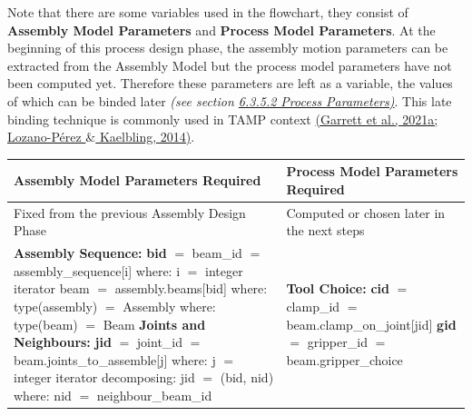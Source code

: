 \documentclass[11pt]{book}
\begin{document}
Note that there are some variables used in the flowchart, they consist of \textbf{Assembly Model Parameters} and \textbf{Process Model Parameters}. At the beginning of this process design phase, the assembly motion parameters can be extracted from the Assembly Model but the process model parameters have not been computed yet. Therefore these parameters are left as a variable, the values of which can be binded later \textit{\textcolor[HTML]{B7B7B7}{(see section \uline{6.3.5.2 Process Parameters)}}}. This late binding technique is commonly used in TAMP context \href{https://www.zotero.org/google-docs/?svi3ss}{(Garrett et al., 2021a; Lozano-Pérez $\&$ Kaelbling, 2014)}.

\begin{table}[H]
\begin{adjustbox}{max width=\textwidth}
\begin{tabular}{p{7.91cm}p{7.97cm}}
\hline
\multicolumn{1}{|p{7.91cm}}{{\footnotesize \textbf{Assembly Model Parameters Required}}} & 
\multicolumn{1}{|p{7.97cm}|}{{\footnotesize \textbf{Process Model Parameters Required}}} \\ 
\hline
\multicolumn{1}{|p{7.91cm}}{{\footnotesize Fixed from the previous Assembly Design Phase}} & 
\multicolumn{1}{|p{7.97cm}|}{{\footnotesize Computed or chosen later in the next steps}} \\ 
\hline
\multicolumn{1}{|p{7.91cm}}{{\footnotesize \textbf{Assembly Sequence:}} \newline
{\footnotesize \textbf{bid }$=$ beam\_id $=$ assembly\_sequence[i]} \newline
{\footnotesize     where: i $=$ integer iterator} \newline
{\footnotesize beam $=$ assembly.beams[bid]} \newline
{\footnotesize     where: type(assembly) $=$ Assembly} \newline
{\footnotesize     where: type(beam) $=$ Beam} \newline
{\footnotesize \textbf{Joints and Neighbours:}} \newline
{\footnotesize \textbf{jid }$=$ joint\_id $=$ beam.joints\_to\_assemble[j] } \newline
{\footnotesize     where: j $=$ integer iterator} \newline
{\footnotesize     decomposing: jid $=$ (bid, nid)} \newline
{\footnotesize     where: nid $=$ neighbour\_beam\_id}} & 
\multicolumn{1}{|p{7.97cm}|}{{\footnotesize \textbf{Tool Choice:}} \newline
{\footnotesize \textbf{cid }$=$ clamp\_id $=$ beam.clamp\_on\_joint[jid]} \newline
{\footnotesize \textbf{gid }$=$ gripper\_id $=$ beam.gripper\_choice}} \\ 
\hline
\end{tabular}
\end{adjustbox}
\end{table}
\end{document}
